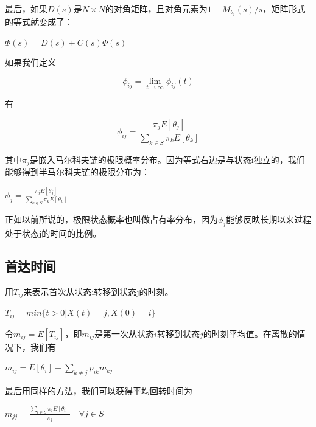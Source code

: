 \documentclass[UTF8]{ctexart}
\begin{document}
最后，如果$D(s)$是$N\times N$的对角矩阵，且对角元素为${1-M_{\theta_i}(s)}/s$，矩阵形式的等式就变成了：

\begin{center}
$\Phi(s)=D(s)+C(s)\Phi(s)$
\end{center}

如果我们定义

\begin{center}
$$\phi_{ij}=\lim_{t \to \infty}\phi_{ij}(t)$$
\end{center}

有
\begin{center}
$$\phi_{ij}=\frac{\pi_jE[\theta_j]}{\sum_{k\in S} \pi_kE[\theta_k]}$$
\end{center}

其中$\pi_j$是嵌入马尔科夫链的极限概率分布。因为等式右边是与状态i独立的，我们能够得到半马尔科夫链的极限分布为：

\begin{center}
$\phi_{j}=\frac{\pi_jE[\theta_j]}{\sum_{k\in S} \pi_kE[\theta_k]}$
\end{center}

正如以前所说的，极限状态概率也叫做占有率分布，因为$\phi_j$能够反映长期以来过程处于状态j的时间的比例。



\subsection{首达时间}
用$T_{ij}$来表示首次从状态i转移到状态j的时刻。

\begin{center}
$T_{ij}=min\{t>0|X(t)=j,X(0)=i\}$
\end{center}

令$m_{ij}=E[T_{ij}]$，即$m_{ij}$是第一次从状态$i$转移到状态$j$的时刻平均值。在离散的情况下，我们有

\begin{center}
$m_{ij}=E[\theta_i]+\sum_{k\ne j} p_{ik}m_{kj}$
\end{center}

最后用同样的方法，我们可以获得平均回转时间为

\begin{center}
$m_{jj}=\frac{\sum_{i \in S} \pi_iE[\theta_i]}{\pi_j} \quad \forall j\in S$
\end{center}
\end{document}
